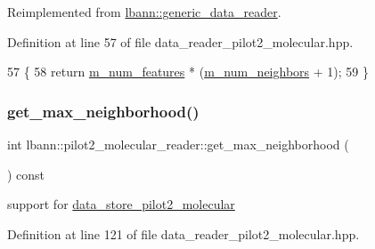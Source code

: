 Reimplemented from \hyperlink{classlbann_1_1generic__data__reader_a246a719477c8c7b6122d41b6f5618d41}{lbann\+::generic\+\_\+data\+\_\+reader}.



Definition at line 57 of file data\+\_\+reader\+\_\+pilot2\+\_\+molecular.\+hpp.


\begin{DoxyCode}
57                                                 \{
58     \textcolor{keywordflow}{return} \hyperlink{classlbann_1_1pilot2__molecular__reader_a7fd7dac6f280fd8ef92bd5d2ffc89e36}{m\_num\_features} * (\hyperlink{classlbann_1_1pilot2__molecular__reader_aaf41323e4da85467de398b4ab4b58c2c}{m\_num\_neighbors} + 1);
59   \}
\end{DoxyCode}
\mbox{\label{classlbann_1_1pilot2__molecular__reader_a1dcc424e004681f9287453df64bb751f}} 
\subsubsection{\texorpdfstring{get\+\_\+max\+\_\+neighborhood()}{get\_max\_neighborhood()}}
{\footnotesize\ttfamily int lbann\+::pilot2\+\_\+molecular\+\_\+reader\+::get\+\_\+max\+\_\+neighborhood (\begin{DoxyParamCaption}{ }\end{DoxyParamCaption}) const\hspace{0.3cm}{\ttfamily [inline]}}



support for \hyperlink{classlbann_1_1data__store__pilot2__molecular}{data\+\_\+store\+\_\+pilot2\+\_\+molecular} 



Definition at line 121 of file data\+\_\+reader\+\_\+pilot2\+\_\+molecular.\+hpp.


